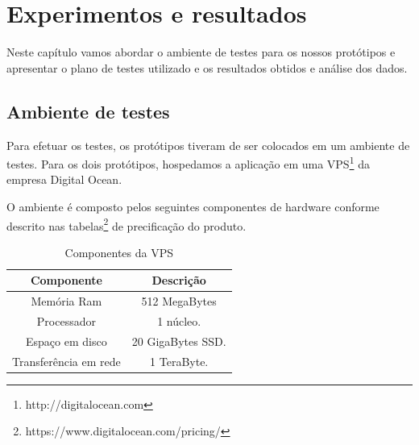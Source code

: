 
\chapter{Experimentos e resultados}
\label{experimentos-resultados}

\vspace{-1.9cm}


 Neste capítulo vamos abordar o ambiente de testes para os nossos protótipos e apresentar 
 o plano de testes utilizado e os resultados obtidos e análise dos dados.

\section{Ambiente de testes}
\label{ambientedetestes}

  Para efetuar os testes, os protótipos tiveram de ser colocados em um ambiente de testes. 
  Para os dois protótipos, hospedamos a aplicação em uma VPS\footnote{http://digitalocean.com} da empresa Digital Ocean.
  
  O ambiente é composto pelos seguintes componentes de hardware conforme descrito nas tabelas\footnote{https://www.digitalocean.com/pricing/}
  de precificação do produto.
  
  \begin{table}[H]
    \centering
    \footnotesize
    \setlength{\abovecaptionskip}{0pt}
    \setlength{\belowcaptionskip}{0pt}
    \caption[Componentes da VPS]{Componentes da VPS}
    \label{tab:components-digital-ocean-vps}
    \begin{tabular}{c|c}
      \hline \hline
      Componente  &	Descrição \\
      \hline \hline
      Memória Ram & 512 MegaBytes \\
      Processador & 1 núcleo. \\
      Espaço em disco & 20 GigaBytes \ac{SSD}. \\
      Transferência em rede & 1 TeraByte. \\
      \hline \hline
    \end{tabular}
  \end{table}

